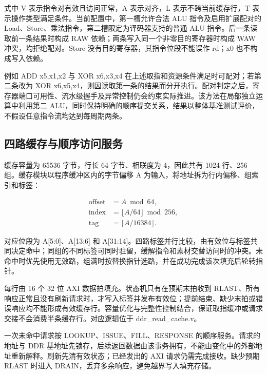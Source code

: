 \documentclass[UTF8,a4paper,12pt]{ctexart}
\begin{document}
式中 V 表示指令对有效且访问正常，A 表示对齐，L 表示不跨当前缓存行，T 表示操作类型满足条件。当前配置中，第一槽允许合法 ALU 指令及启用扩展配对的 Load、Store、乘法指令，第二槽限定为译码器支持的普通 ALU 指令。后一条读取前一条结果时构成 RAW 依赖；两条写入同一个非零目的寄存器时构成 WAW 冲突，均拒绝配对。Store 没有目的寄存器，其指令位段不能误作 rd；x0 也不构成写入依赖。\par

例如 ADD x5,x1,x2 与 XOR x6,x3,x4 在上述取指和资源条件满足时可配对；若第二条改为 XOR x6,x5,x4，则因读取第一条的结果而分开执行。配对判定之后，寄存器端口可用性、流水级握手及异常控制仍会约束实际推进。该方法在局部独立运算中利用第二 ALU，同时保持明确的顺序提交关系，结果以整体基准测试评价，不假设任意指令流均达到每周期两条。\par

\subsection{四路缓存与顺序访问服务}

缓存容量为 65536 字节，行长 64 字节、相联度为 4，因此共有 1024 行、256 组。缓存模块以程序缓冲区内的字节偏移 A 为输入，将地址拆为行内偏移、组索引和标签：\par

\[
\begin{aligned}\mathrm{offset}&=A\bmod64,\\\mathrm{index}&=\lfloor A/64\rfloor\bmod256,\\\mathrm{tag}&=\lfloor A/16384\rfloor.\end{aligned}
\]

对应位段为 A[5:0]、A[13:6] 和 A[31:14]。四路标签并行比较，由有效位与标签共同决定命中；同组的不同标签可同时驻留，缓解指令和素材交替访问时的冲突。未命中时优先使用无效路，组满时按替换指针选路，并在成功完成该次填充后轮转指针。\par

每行由 16 个 32 位 AXI 数据拍填充。状态机只有在预期末拍收到 RLAST、所有响应正常且没有刷新请求时，才写入标签并发布有效位；提前结束、缺少末拍或错误响应均不能形成有效缓存行。容量优化与完整性控制结合，保证取指缓冲或请求交接不会消费半条缓存行。对应逻辑位于 ddr\_read\_cache.v。\par

一次未命中请求按 LOOKUP、ISSUE、FILL、RESPONSE 的顺序服务。请求的地址与 DDR 基地址先锁存，后续返回数据由该事务拥有，不能由变化中的外部地址重新解释。刷新先清有效状态；已经发出的 AXI 请求仍需完成接收。缺少预期 RLAST 时进入 DRAIN，丢弃多余响应，避免越界写入填充存储。\par
\end{document}
